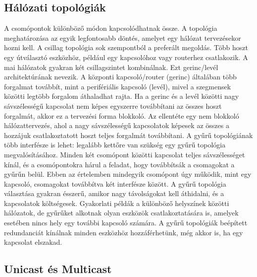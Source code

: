 \subsection{Hálózati topológiák}
A csomópontok különböző módon kapcsolódhatnak össze. A topológia meghatározása
az egyik legfontosabb döntés, amelyet egy hálózat tervezésekor hozni kell. A
csillag topológia sok szempontból a preferált megoldás. Több hoszt egy
útválasztó eszközhöz, például egy kapcsolóhoz vagy routerhez csatlakozik. A mai
hálózatok gyakran két csillagszintet kombinálnak. Ezt gerinc/levél architektúrának
nevezik. A központi kapcsoló/router (gerinc) általában több forgalmat továbbít,
mint a perifériális kapcsoló (levél), mivel a szegmensek közötti legtöbb
forgalom áthaladhat rajta. Ha a gerinc és a levél közötti nagy sávszélességű
kapcsolat nem képes egyszerre továbbítani az összes hoszt forgalmát, akkor ez a
tervezési forma blokkoló. Az ellentéte egy nem blokkoló hálózattervezés, ahol a
nagy sávszélességű kapcsolatok képesek az összes a hozzájuk csatlakoztatott
hoszt teljes forgalmát továbbítani. A gyűrű topológiának több interfésze is lehet:
legalább kettőre van szükség egy gyűrű topológia megvalósításához. Minden két
csomópont közötti kapcsolat teljes sávszélességet kínál, és a csomópontokra
hárul a feladat, hogy továbbítsák a csomagokat a gyűrűn belül. Ebben az
értelemben mindegyik csomópont úgy működik, mint egy kapcsoló, csomagokat
továbbítva két interfésze között. A gyűrű topológia választása gyakran ésszerű,
amikor nagy távolságokat kell áthidalni, és a kapcsolatok költségesek.
Gyakorlati példák a különböző helyszínek közötti hálózatok, de gyűrűket alkotnak
olyan eszközök csatlakoztatására is, amelyek esetében nincs hely egy további
kapcsoló számára. A gyűrű topológiák beépített redundanciát kínálnak minden
eszközhöz hozzáférhetünk, még akkor is, ha egy kapcsolat elszakad.

\subsection{Unicast és Multicast} %

